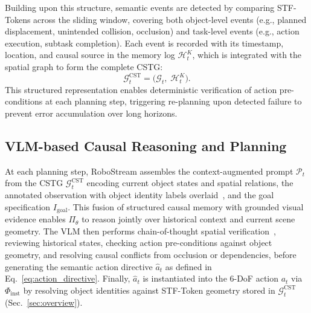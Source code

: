 Building upon this structure, semantic events are detected by comparing STF-Tokens across the sliding window, covering both object-level events (e.g., planned displacement, unintended collision, occlusion) and task-level events (e.g., action execution, subtask completion). Each event is recorded with its timestamp, location, and causal source in the memory log $\mathcal{H}_t^{K}$, which is integrated with the spatial graph to form the complete CSTG:
\begin{equation}
\mathcal{G}_t^{\text{CST}} = \big( \mathcal{G}_t,\; \mathcal{H}_t^{K} \big).
\label{eq:cstg}
\end{equation}
This structured representation enables deterministic verification of action pre-conditions at each planning step, triggering re-planning upon detected failure to prevent error accumulation over long horizons.




\subsection{VLM-based Causal Reasoning and Planning}
\label{sec:vlm_planning}

At each planning step, RoboStream assembles the context-augmented prompt $\mathcal{P}_t$ from the CSTG $\mathcal{G}_t^{\text{CST}}$ encoding current object states and spatial relations, the annotated observation with object identity labels overlaid~\cite{yang2023set}, and the goal specification $I_{\text{goal}}$. This fusion of structured causal memory with grounded visual evidence enables $\Pi_{\theta}$ to reason jointly over historical context and current scene geometry. The VLM then performs chain-of-thought spatial verification~\cite{wei2022chain}, reviewing historical states, checking action pre-conditions against object geometry, and resolving causal conflicts from occlusion or dependencies, before generating the semantic action directive $\hat{a}_t$ as defined in Eq.~\ref{eq:action_directive}. Finally, $\hat{a}_t$ is instantiated into the 6-DoF action $a_t$ via $\Phi_{\text{inst}}$ by resolving object identities against STF-Token geometry stored in $\mathcal{G}_t^{\text{CST}}$ (Sec.~\ref{sec:overview}).